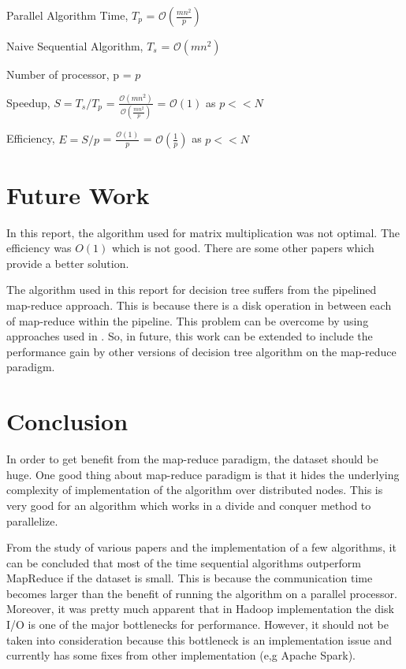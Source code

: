 \documentclass{article}
\begin{document}
\BlankLine Parallel Algorithm Time, ${T_{p}}$ = $\mathcal{O}(\frac{mn^{2}}{p})$

\BlankLine Naive Sequential Algorithm, ${T_{s}}$ = $\mathcal{O}(mn^{2})$

\BlankLine Number of processor, p = $p$

\BlankLine Speedup, ${S = T_{s}/T_{p}}$ = $\frac{\mathcal{O}(mn^{2})}{\mathcal{O}(\frac{mn^{2}}{p})}$ = $\mathcal{O}(1)$ as $p << N$

\BlankLine Efficiency, ${E = S/p}$ = $\frac{\mathcal{O}(1)}{p}$ = $\mathcal{O}(\frac{1}{p})$ as $p << N$

\section{Future Work}
In this report, the algorithm used for matrix multiplication was not optimal. The efficiency was $O(1)$ which is not good. There are some other papers which provide a better solution.

The algorithm used in this report for decision tree suffers from the pipelined map-reduce approach. This is because there is a disk operation in between each of map-reduce within the pipeline. This problem can be overcome by using approaches used in \cite{c452017}. So, in future, this work can be extended to include the performance gain by other versions of decision tree algorithm on the map-reduce paradigm.

\section{Conclusion}
In order to get benefit from the map-reduce paradigm, the dataset should be huge. One good thing about map-reduce paradigm is that it hides the underlying complexity of implementation of the algorithm over distributed nodes. This is very good for an algorithm which works in a divide and conquer method to parallelize.

From the study of various papers and the implementation of a few algorithms, it can be concluded that most of the time sequential algorithms outperform MapReduce if the dataset is small. This is because the communication time becomes larger than the benefit of running the algorithm on a parallel processor.
Moreover, it was pretty much apparent that in Hadoop implementation the disk I/O is one of the major bottlenecks for performance. However, it should not be taken into consideration because this bottleneck is an implementation issue and currently has some fixes from other implementation (e,g Apache Spark).
\end{document}
